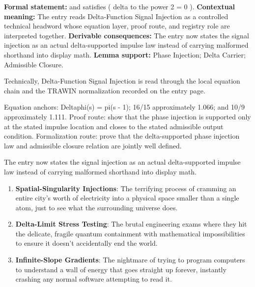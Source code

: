 \begingroup\footnotesize\setlength{\emergencystretch}{3em}\sloppy
\textbf{Formal statement:} and satisfies ( delta to the power 2 = 0 ). \textbf{Contextual meaning:} The entry reads Delta-Function Signal Injection as a controlled technical headword whose equation layer, proof route, and registry role are interpreted together. \textbf{Derivable consequences:} The entry now states the signal injection as an actual delta-supported impulse law instead of carrying malformed shorthand into display math. \textbf{Lemma support:} Phase Injection; Delta Carrier; Admissible Closure.\par
\endgroup

Technically, Delta-Function Signal Injection is read through the local equation chain and the TRAWIN normalization recorded on the entry page.

Equation anchors: Deltaphi(s) = pi(s - 1); 16/15 approximately 1.066; and 10/9 approximately 1.111. Proof route: show that the phase injection is supported only at the stated impulse location and closes to the stated admissible output condition. Formalization route: prove that the delta-supported phase injection law and admissible closure relation are jointly well defined.

The entry now states the signal injection as an actual delta-supported impulse law instead of carrying malformed shorthand into display math.
\endgroup

\begin{enumerate}[leftmargin=1.6em,itemsep=6pt,topsep=4pt]
\item \textbf{Spatial-Singularity Injections}: The terrifying process of cramming an entire city's worth of electricity into a physical space smaller than a single atom, just to see what the surrounding universe does.
\item \textbf{Delta-Limit Stress Testing}: The brutal engineering exams where they hit the delicate, fragile quantum containment with mathematical impossibilities to ensure it doesn't accidentally end the world.
\item \textbf{Infinite-Slope Gradients}: The nightmare of trying to program computers to understand a wall of energy that goes straight up forever, instantly crashing any normal software attempting to read it.
\end{enumerate}

